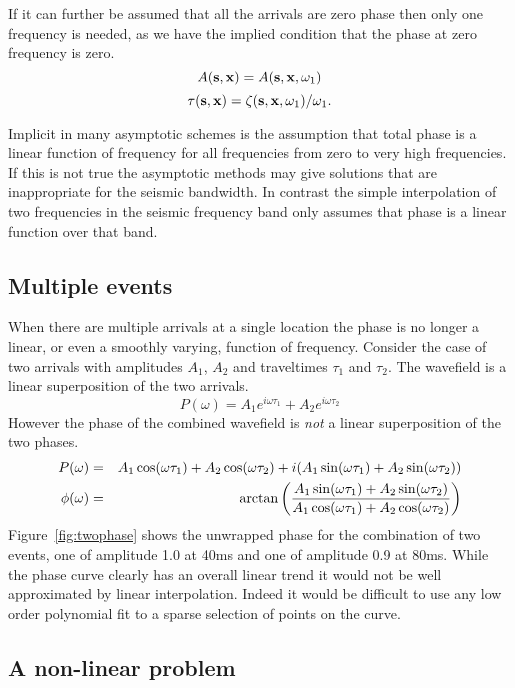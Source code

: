 If it can further be assumed that all the arrivals are zero phase then
only one frequency is needed, as we have the implied condition that
the phase at zero frequency is zero.
$$
A({\bf s},{\bf x}) =  A({\bf s},{\bf x},\omega_1)
$$
$$
\tau({\bf s},{\bf x}) =  \zeta({\bf s},{\bf x},\omega_1) /\omega_1 .
$$

Implicit in many asymptotic schemes is the assumption that total phase
is a linear function of frequency for all frequencies from zero to
very high frequencies. If this is not true the asymptotic methods may
give solutions that are inappropriate for the seismic bandwidth. In
contrast the simple interpolation of two frequencies in the seismic
frequency band only assumes that phase is a linear function over that
band.

\subsection{Multiple events}

When there are multiple arrivals at a single location the phase is
no longer a linear, or even a smoothly varying, function of frequency.
Consider the case of two arrivals with amplitudes $A_1$, $A_2$ and
traveltimes $\tau_1$ and $\tau_2$. The wavefield is a linear superposition
of the two arrivals.
$$
P(\omega) = A_1 e^{i\omega\tau_1} + A_2 e^{i\omega\tau_2}
$$
However the phase of the combined wavefield is {\em not} a linear
superposition of the two phases.
\begin{eqnarray*}
P(\omega) & = & A_1 \cos(\omega\tau_1)+ A_2 \cos(\omega\tau_2) + i( A_1 \sin(\omega\tau_1) + A_2 \sin(\omega\tau_2)) \cr
\phi(\omega) & = & \arctan \left( \frac{ A_1 \sin(\omega\tau_1) + A_2 \sin(\omega\tau_2)}{  A_1 \cos(\omega\tau_1)+ A_2 \cos(\omega\tau_2) } \right)
\end{eqnarray*}
Figure~\ref{fig:twophase} shows the unwrapped phase for the combination of
two events, one of amplitude 1.0 at 40ms and one of amplitude 0.9 at
80ms. While the phase curve clearly has an overall linear trend it
would not be well approximated by linear interpolation. Indeed it
would be difficult to use any low order polynomial fit to a sparse
selection of points on the curve.


\subsection{A non-linear problem}

